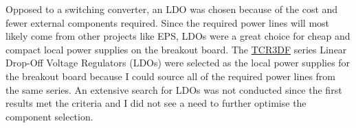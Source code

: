 Opposed to a switching converter, an LDO was chosen because of the cost and fewer external components required.
Since the required power lines will most likely come from other projects like EPS, LDOs were a great choice for cheap and compact local power supplies on the breakout board.
\nl
The \href{https://au.mouser.com/c/semiconductors/power-management-ics/voltage-regulators-voltage-controllers/ldo-voltage-regulators/?m=Toshiba&series=TCR3DF}{TCR3DF} series Linear Drop-Off Voltage Regulators (LDOs) were selected as the local power supplies for the breakout board because I could source all of the required power lines from the same series.
An extensive search for LDOs was not conducted since the first results met the criteria and I did not see a need to further optimise the component selection.

